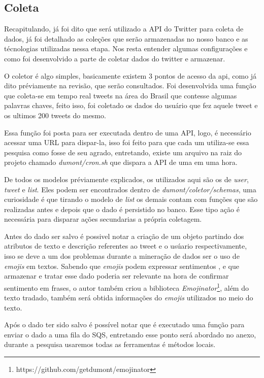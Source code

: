 \subsection{Coleta}
Recapitulando, já foi dito que será utilizado a API do Twitter para coleta de dados, já foi detalhado as coleções que serão armazenadas no nosso banco e as técnologias utilizadas nessa etapa. Nos resta entender algumas configurações e como foi desenvolvido a parte de coletar dados do twitter e armazenar.

O coletor é algo simples, basicamente existem 3 pontos de acesso da api, como já dito préviamente na revisão, que serão consultados. Foi desenvolvida uma função que coleta-se em tempo real tweets na área do Brasil que contesse algumas palavras chaves, feito isso, foi coletado os dados do usuário que fez aquele tweet e os ultimos 200 tweets do mesmo.

Essa função foi posta para ser executada dentro de uma API, logo, é necessário acessar uma URL para dispar-la, isso foi feito para que cada um utiliza-se essa pesquisa como fosse de seu agrado, entretando, existe um arquivo na raiz do projeto chamado \textit{dumont/cron.sh} que dispara a API de uma em uma hora.

De todos os modelos préviamente explicados, os utilizados aqui são os de \textit{user}, \textit{tweet} e \textit{list}. Eles podem ser encontrados dentro de \textit{dumont/coletor/schemas}, uma curiosidade é que tirando o modelo de \textit{list} os demais contam com funções que são realizadas antes e depois que o dado é persistido no banco. Esse tipo ação é necessária para disparar ações secundarias a própria coletagem.

Antes do dado ser salvo é possivel notar a criação de um objeto partindo dos atributos de texto e descrição referentes ao tweet e o usúario respectivamente, isso se deve a um dos problemas durante a mineração de dados ser o uso de \textit{emojis} em textos. Sabendo que \textit{emojis} podem expressar sentimentos \cite{novak2015sentiment}, e que armazenar e tratar esse dado poderia ser relevante na hora de confirmar sentimento em frases, o autor também criou a biblioteca \textit{Emojinator}\footnote{https://github.com/getdumont/emojinator}, além do texto tradado, também será obtida informações do \textit{emojis} utilizados no meio do texto.

Após o dado ter sido salvo é possível notar que é executado uma função para enviar o dado a uma fila do SQS, entretando esse ponto será abordado no anexo, durante a pesquisa usaremos todas as ferramentas é métodos locais.

